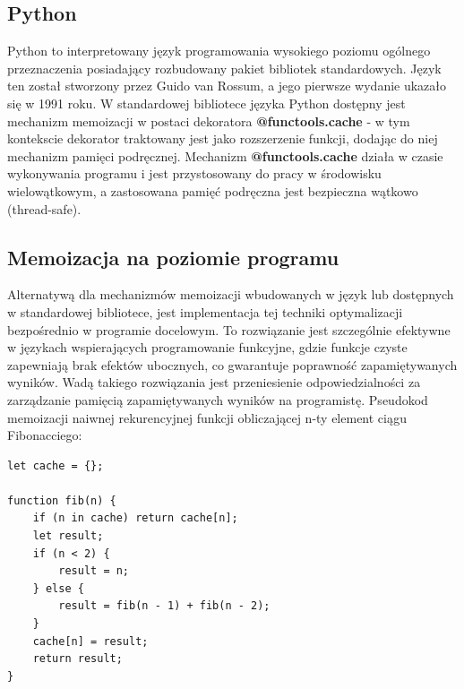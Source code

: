 \subsection{Python}
Python to interpretowany język programowania wysokiego poziomu ogólnego przeznaczenia posiadający rozbudowany pakiet bibliotek standardowych. Język ten został stworzony przez Guido van Rossum, a jego pierwsze wydanie ukazało się w 1991 roku. W standardowej bibliotece języka Python dostępny jest mechanizm memoizacji w postaci dekoratora \textbf{@functools.cache} - w tym kontekscie dekorator traktowany jest jako rozszerzenie funkcji, dodając do niej mechanizm pamięci podręcznej. Mechanizm \textbf{@functools.cache} działa w czasie wykonywania programu i jest przystosowany do pracy w środowisku wielowątkowym, a zastosowana pamięć podręczna jest bezpieczna wątkowo (thread-safe).
\subsection{Memoizacja na poziomie programu}
Alternatywą dla mechanizmów memoizacji wbudowanych w język lub dostępnych w standardowej bibliotece, jest implementacja tej techniki optymalizacji bezpośrednio w programie docelowym. To rozwiązanie jest szczególnie efektywne w językach wspierających programowanie funkcyjne, gdzie funkcje czyste zapewniają brak efektów ubocznych, co gwarantuje poprawność zapamiętywanych wyników. Wadą takiego rozwiązania jest przeniesienie odpowiedzialności za zarządzanie pamięcią zapamiętywanych wyników na programistę. Pseudokod memoizacji naiwnej rekurencyjnej funkcji obliczającej n-ty element ciągu Fibonacciego:
\begin{lstlisting}[caption={Memoizacja na poziomie programu}, morekeywords={function, in, let}]
let cache = {};

function fib(n) {
    if (n in cache) return cache[n];
    let result;
    if (n < 2) {
        result = n;
    } else {
        result = fib(n - 1) + fib(n - 2);
    }
    cache[n] = result;
    return result;
}
\end{lstlisting}

